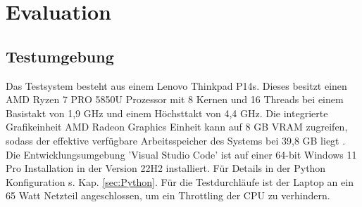 \chapter{Evaluation}
\label{ch:Evaluation}
\section{Testumgebung}{ \label{sec:testumgebung}
Das Testsystem besteht aus einem Lenovo Thinkpad P14s. Dieses besitzt einen AMD Ryzen 7 PRO 5850U Prozessor mit 8 Kernen und 16 Threads bei einem Basistakt von 1,9 GHz und einem Höchsttakt von 4,4 GHz. Die integrierte Grafikeinheit AMD Radeon Graphics Einheit kann auf 8 GB VRAM zugreifen, sodass der effektive verfügbare Arbeitsspeicher des Systems bei 39,8 GB liegt \citep{PSREF21}. Die Entwicklungsumgebung 'Visual Studio Code' ist auf einer 64-bit Windows 11 Pro Installation in der Version 22H2 installiert. Für Details in der Python Konfiguration s. Kap. \ref{sec:Python}. Für die Testdurchläufe ist der Laptop an ein 65 Watt Netzteil angeschlossen, um ein Throttling der CPU zu verhindern.}



